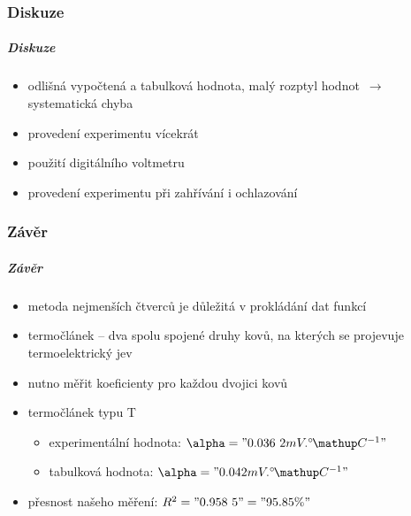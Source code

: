 \documentclass[smaller,aspectratio=1610,handout]{beamer}
\begin{document}
\section{Diskuze}
\begin{frame}
	\frametitle{Diskuze}
	\begin{itemize}
		\item odlišná vypočtená a tabulková hodnota, malý rozptyl 
			hodnot~$\rightarrow$ systematická chyba
		\item provedení experimentu vícekrát
		\item použití digitálního voltmetru
		\item provedení experimentu při zahřívání i ochlazování
	\end{itemize}
\end{frame}

\section{Závěr}
\begin{frame}
	\frametitle{Závěr}
	\begin{itemize}
		\item metoda nejmenších čtverců je důležitá v prokládání dat funkcí
		\item termočlánek -- dva spolu spojené druhy kovů, na kterých se
			projevuje termoelektrický jev
		\item nutno měřit koeficienty pro každou dvojici kovů
		\item termočlánek typu T
			\begin{itemize}
				\item experimentální hodnota: $\alpha = "0.036~2 mV.\C^{-1}"$
				\item tabulková hodnota: $\alpha = "0.042 mV.\C^{-1}"$
			\end{itemize}
		\item přesnost našeho měření: $R^2="0.958~5"="95.85 \%"$
	\end{itemize}
\end{frame}


\part{}
\end{document}
